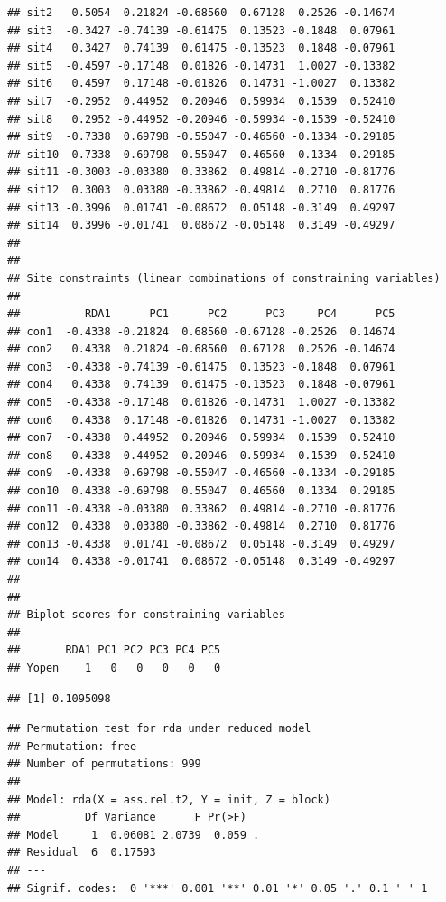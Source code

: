\documentclass[
]{article}
\begin{document}
\begin{verbatim}
## sit2   0.5054  0.21824 -0.68560  0.67128  0.2526 -0.14674
## sit3  -0.3427 -0.74139 -0.61475  0.13523 -0.1848  0.07961
## sit4   0.3427  0.74139  0.61475 -0.13523  0.1848 -0.07961
## sit5  -0.4597 -0.17148  0.01826 -0.14731  1.0027 -0.13382
## sit6   0.4597  0.17148 -0.01826  0.14731 -1.0027  0.13382
## sit7  -0.2952  0.44952  0.20946  0.59934  0.1539  0.52410
## sit8   0.2952 -0.44952 -0.20946 -0.59934 -0.1539 -0.52410
## sit9  -0.7338  0.69798 -0.55047 -0.46560 -0.1334 -0.29185
## sit10  0.7338 -0.69798  0.55047  0.46560  0.1334  0.29185
## sit11 -0.3003 -0.03380  0.33862  0.49814 -0.2710 -0.81776
## sit12  0.3003  0.03380 -0.33862 -0.49814  0.2710  0.81776
## sit13 -0.3996  0.01741 -0.08672  0.05148 -0.3149  0.49297
## sit14  0.3996 -0.01741  0.08672 -0.05148  0.3149 -0.49297
## 
## 
## Site constraints (linear combinations of constraining variables)
## 
##          RDA1      PC1      PC2      PC3     PC4      PC5
## con1  -0.4338 -0.21824  0.68560 -0.67128 -0.2526  0.14674
## con2   0.4338  0.21824 -0.68560  0.67128  0.2526 -0.14674
## con3  -0.4338 -0.74139 -0.61475  0.13523 -0.1848  0.07961
## con4   0.4338  0.74139  0.61475 -0.13523  0.1848 -0.07961
## con5  -0.4338 -0.17148  0.01826 -0.14731  1.0027 -0.13382
## con6   0.4338  0.17148 -0.01826  0.14731 -1.0027  0.13382
## con7  -0.4338  0.44952  0.20946  0.59934  0.1539  0.52410
## con8   0.4338 -0.44952 -0.20946 -0.59934 -0.1539 -0.52410
## con9  -0.4338  0.69798 -0.55047 -0.46560 -0.1334 -0.29185
## con10  0.4338 -0.69798  0.55047  0.46560  0.1334  0.29185
## con11 -0.4338 -0.03380  0.33862  0.49814 -0.2710 -0.81776
## con12  0.4338  0.03380 -0.33862 -0.49814  0.2710  0.81776
## con13 -0.4338  0.01741 -0.08672  0.05148 -0.3149  0.49297
## con14  0.4338 -0.01741  0.08672 -0.05148  0.3149 -0.49297
## 
## 
## Biplot scores for constraining variables
## 
##       RDA1 PC1 PC2 PC3 PC4 PC5
## Yopen    1   0   0   0   0   0
\end{verbatim}

\begin{verbatim}
## [1] 0.1095098
\end{verbatim}

\begin{verbatim}
## Permutation test for rda under reduced model
## Permutation: free
## Number of permutations: 999
## 
## Model: rda(X = ass.rel.t2, Y = init, Z = block)
##          Df Variance      F Pr(>F)  
## Model     1  0.06081 2.0739  0.059 .
## Residual  6  0.17593                
## ---
## Signif. codes:  0 '***' 0.001 '**' 0.01 '*' 0.05 '.' 0.1 ' ' 1
\end{verbatim}
\end{document}
